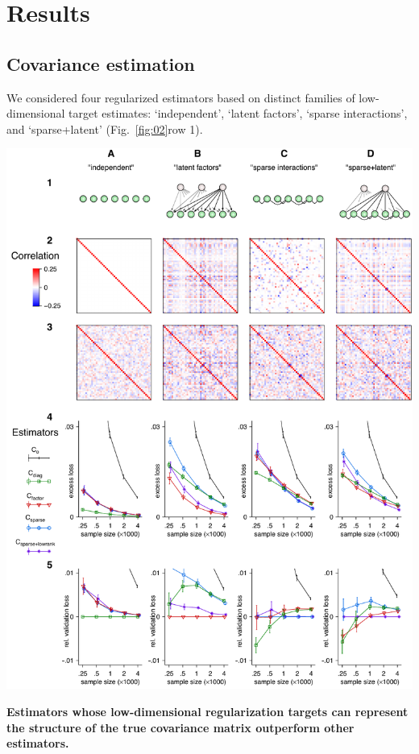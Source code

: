 \documentclass[10pt]{article}
\begin{document}
\section*{Results}

\subsection*{Covariance estimation}
We considered four regularized estimators based on distinct families of low-dimensional target estimates: `independent', `latent factors', `sparse interactions', and `sparse+latent' (Fig.~\ref{fig:02}\;row 1).  

\begin{FPfigure}
    \begin{center}
        \includegraphics{./figures/Figure02.pdf}
    \end{center}
    \caption{{\bf Estimators whose low-dimensional regularization targets can represent the structure of the true covariance matrix outperform other estimators.}
}
\end{FPfigure}
\end{document}
